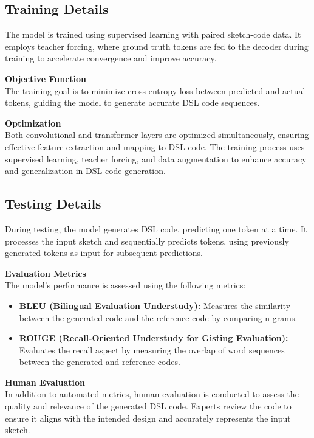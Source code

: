  \subsection{Training Details}
 The model is trained using supervised learning with paired sketch-code data. It employs teacher forcing, where ground truth tokens are fed to the decoder during training to accelerate convergence and improve accuracy.

 \textbf{Objective Function}\\
 The training goal is to minimize cross-entropy loss between predicted and actual tokens, guiding the model to generate accurate DSL code sequences.

 \textbf{Optimization}\\
 Both convolutional and transformer layers are optimized simultaneously, ensuring effective feature extraction and mapping to DSL code.
The training process uses supervised learning, teacher forcing, and data augmentation to enhance accuracy and generalization in DSL code generation.
 \subsection{Testing Details}
 During testing, the model generates DSL code, predicting one token at a time. It processes the input sketch and sequentially predicts tokens, using previously generated tokens as input for subsequent predictions.

 \textbf{Evaluation Metrics}\\
 The model's performance is assessed using the following metrics:
 \begin{itemize}
    \item \textbf{BLEU (Bilingual Evaluation Understudy):} Measures the similarity between the generated code and the reference code by comparing n-grams.
    \item \textbf{ROUGE (Recall-Oriented Understudy for Gisting Evaluation):} Evaluates the recall aspect by measuring the overlap of word sequences between the generated and reference codes.
\end{itemize}
\textbf{Human Evaluation}\\
In addition to automated metrics, human evaluation is conducted to assess the quality and relevance of the generated DSL code. Experts review the code to ensure it aligns with the intended design and accurately represents the input sketch.
\pagebreak